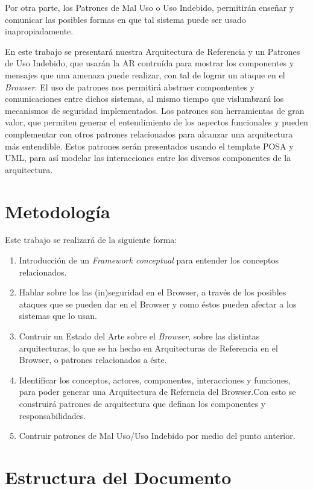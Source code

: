 Por otra parte, los Patrones de Mal Uso o Uso Indebido, permitirán enseñar y comunicar las posibles formas en que tal sistema puede ser usado inapropiadamente.

En este trabajo se presentará nuestra Arquitectura de Referencia y un Patrones de Uso Indebido, que usarán la AR contruída para mostrar los componentes y mensajes que una amenaza puede realizar, con tal de lograr un ataque en el \textit{Browser}. El uso de patrones nos permitirá abstraer compontentes y comunicaciones entre dichos sistemas, al mismo tiempo que vislumbrará los mecanismos de seguridad implementados. Los patrones son herramientas de gran valor, que permiten generar el entendimiento de los aspectos funcionales y pueden complementar con otros patrones relacionados para alcanzar una arquitectura más entendible. Estos patrones serán presentados usando el template POSA \cite{buschman1996system} y UML, para así modelar las interacciones entre los diversos componentes de la arquitectura.

\section{Metodología}
\label{chap1:Met}
Este trabajo se realizará de la siguiente forma:
\begin{enumerate}
	\item Introducción de un \textit{Framework conceptual} para entender los conceptos relacionados.
	\item Hablar sobre los las (in)seguridad en el Browser, a través de los posibles ataques que se pueden dar en el Browser y como éstos pueden afectar a los sistemas que lo usan.
	\item Contruir un Estado del Arte sobre el \textit{Browser}, sobre las distintas arquitecturas, lo que se ha hecho en Arquitecturas de Referencia en el Browser, o patrones relacionados a éste.
	\item Identificar los conceptos, actores, componentes, interacciones y funciones, para poder generar una Arquitectura de Referncia del Browser.Con esto se construirá patrones de arquitectura que definan los componentes y responsabilidades.
	\item Contruir patrones de Mal Uso/Uso Indebido por medio del punto anterior.
\end{enumerate}

\section{Estructura del Documento}
\label{chap1:estruct}


